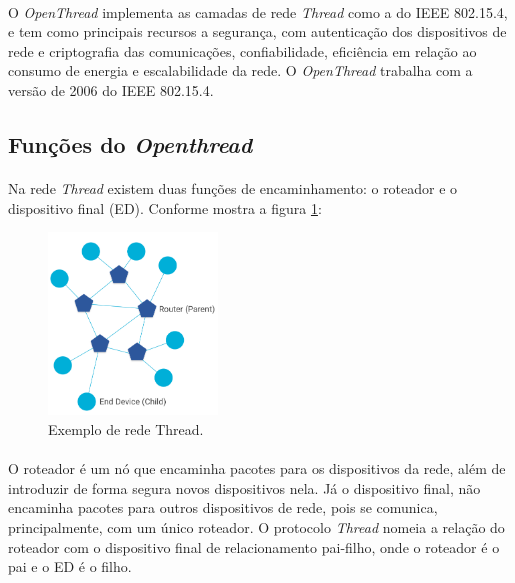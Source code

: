 \paragraph{} O \textit{OpenThread} implementa as camadas de rede \textit{Thread} como a do IEEE 802.15.4, e tem como principais recursos a segurança, com autenticação dos dispositivos de rede e criptografia das comunicações, confiabilidade, eficiência em relação ao consumo de energia e escalabilidade da rede. O \textit{OpenThread} trabalha com a versão de 2006 do IEEE 802.15.4. 

\subsection{Funções do \textit{Openthread}}
\paragraph{} Na rede \textit{Thread} existem duas funções de encaminhamento: o roteador e o dispositivo final (ED). Conforme mostra a figura \ref{fig:figura13}:

\begin{figure}[!ht]
	\centering
	\includegraphics[width=0.4\textwidth]{Figuras/openthread.PNG}   
	\caption{Exemplo de rede Thread. \citep{Open}}
	\label{fig:figura13}
\end{figure}

\paragraph{}O roteador é um nó que encaminha pacotes para os dispositivos da rede, além de introduzir de forma segura novos dispositivos nela. Já o dispositivo final, não encaminha pacotes para outros dispositivos de rede, pois se comunica, principalmente, com um único roteador.
O protocolo \textit{Thread} nomeia a relação do roteador com o dispositivo final de relacionamento pai-filho, onde o roteador é o pai e o ED é o filho.

